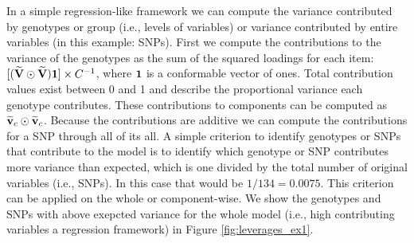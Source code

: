 \documentclass[12pt]{article}
\begin{document}
In a simple regression-like framework we can compute the variance
contributed by genotypes or group (i.e., levels of variables) or
variance contributed by entire variables (in this example: SNPs). First
we compute the contributions to the variance of the genotypes as the sum
of the squared loadings for each item:
\([(\widetilde{\bf V} \odot \widetilde{\bf V}){\bf 1}] \times C^{-1}\),
where \({\bf 1}\) is a conformable vector of ones. Total contribution
values exist between 0 and 1 and describe the proportional variance each
genotype contributes. These contributions to components can be computed
as \(\widetilde{\bf v}_{c} \odot \widetilde{\bf v}_{c}\). Because the
contributions are additive we can compute the contributions for a SNP
through all of its all. A simple criterion to identify genotypes or SNPs
that contribute to the model is to identify which genotype or SNP
contributes more variance than expected, which is one divided by the
total number of original variables (i.e., SNPs). In this case that would
be \(1/ 134 = 0.0075\). This criterion can be applied on the whole or
component-wise. We show the genotypes and SNPs with above exepcted
variance for the whole model (i.e., high contributing variables a
regression framework) in Figure \ref{fig:leverages_ex1}.
\end{document}
